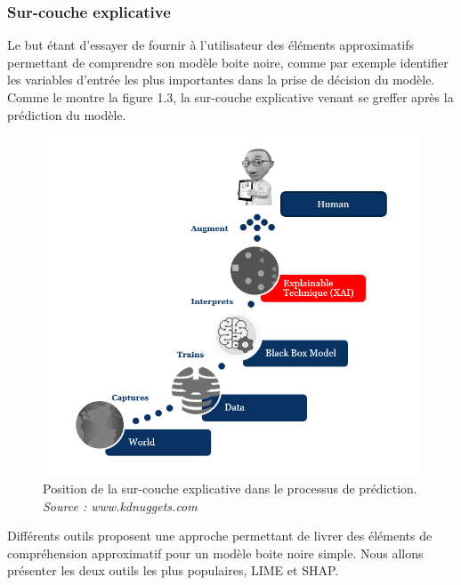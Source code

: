 \subsubsection{Sur-couche explicative}
Le but étant d'essayer de fournir à l'utilisateur des éléments approximatifs permettant de comprendre son modèle boite noire, comme par exemple identifier les variables d'entrée les plus importantes dans la prise de décision du modèle. Comme le montre la figure 1.3, la sur-couche explicative venant se greffer après la prédiction du modèle.
\begin{figure}[h]
\centering
\includegraphics[scale=0.35]{src_img/explainCouche.png}
\caption{Position de la sur-couche explicative dans le processus de prédiction. \textit{Source : www.kdnuggets.com}}
\label{explainCouche}
\end{figure}
Différents outils proposent une approche permettant de livrer des éléments de compréhension approximatif pour un modèle boite noire simple. Nous allons présenter les deux outils les plus populaires, LIME et SHAP.
